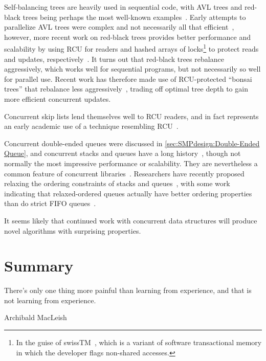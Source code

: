 Self-balancing trees are heavily used in sequential code, with
AVL trees and red-black trees being perhaps the most well-known
examples~\cite{ThomasHCorman2001Algorithms}.
Early attempts to parallelize AVL trees were complex and not necessarily
all that efficient~\cite{Ellis80},
however, more recent work on red-black trees provides better
performance and scalability by using RCU for readers and hashed arrays
of locks\footnote{
	In the guise of swissTM~\cite{AleksandarDragovejic2011STMnotToy},
	which is a variant of software transactional memory in which
	the developer flags non-shared accesses.}
to protect reads and updates,
respectively~\cite{PhilHoward2011RCUTMRBTree,PhilipWHoward2013RCUrbtree}.
It turns out that red-black trees rebalance aggressively, which works
well for sequential programs, but not necessarily so well for parallel
use.
Recent work has therefore made use of RCU-protected ``bonsai trees''
that rebalance less aggressively~\cite{AustinClements2012RCULinux:mmapsem},
trading off optimal tree depth to gain more efficient concurrent updates.

Concurrent skip lists lend themselves well to RCU readers, and in fact
represents an early academic use of a technique resembling
RCU~\cite{Pugh90}.

Concurrent double-ended queues were discussed in
\cref{sec:SMPdesign:Double-Ended Queue},
and concurrent stacks and queues have a long history~\cite{Treiber86},
though not normally the most impressive performance or scalability.
They are nevertheless a common feature of concurrent
libraries~\cite{PaulMcKenney2013LWNURCUqueuestack}.
Researchers have recently proposed relaxing the ordering constraints
of stacks and queues~\cite{Shavit:2011:DSM:1897852.1897873},
with some work indicating that relaxed-ordered queues actually have
better ordering properties than do strict FIFO
queues~\cite{AndreasHaas2012FIFOisnt,ChristophMKirsch2012FIFOisntTR,AndreasHaas2013CFRelaxedQueues}.

It seems likely that continued work with concurrent data structures will
produce novel algorithms with surprising properties.

\section{Summary}
\label{sec:datastruct:Summary}
%
\epigraph{There's only one thing more painful than learning from
	  experience, and that is not learning from experience.}
	 {Archibald MacLeish}

